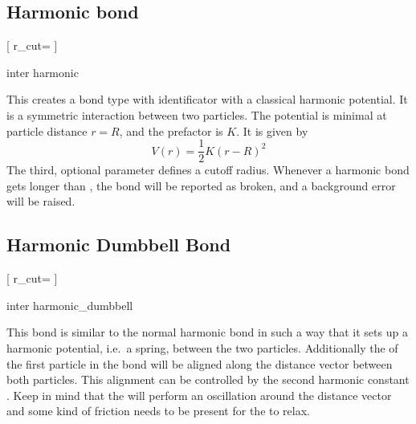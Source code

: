 \subsection{Harmonic bond}

\begin{pysyntax}
  [
    r_cut=
  ]
\end{pysyntax}

\begin{essyntax}
  inter 
  harmonic   
\end{essyntax}
This creates a bond type with identificator  with a
classical harmonic potential. It is a symmetric interaction between two
particles. The potential is minimal at particle distance $r=R$, and the
prefactor is $K$. It is given by
\begin{equation}
  V(r) = \frac{1}{2} K \left( r - R \right)^2
\end{equation}
The third, optional parameter  defines a cutoff
radius.  Whenever a harmonic bond gets longer than
, the bond will be reported as broken, and a
background error will be raised.

\subsection{Harmonic Dumbbell Bond}

\begin{pysyntax}
  [
    r_cut=
  ]
\end{pysyntax}

\begin{essyntax}
  inter 
  harmonic_dumbbell    
  \begin{features}
  \end{features}
\end{essyntax}
This bond is similar to the normal harmonic bond in such a way that it
sets up a harmonic potential, i.e.\ a spring, between the two
particles.  Additionally the  of the first particle in
the bond will be aligned along the distance vector between both
particles.  This alignment can be controlled by the second harmonic
constant .  Keep in mind that the  will perform
an oscillation around the distance vector and some kind of friction
needs to be present for the  to relax.


